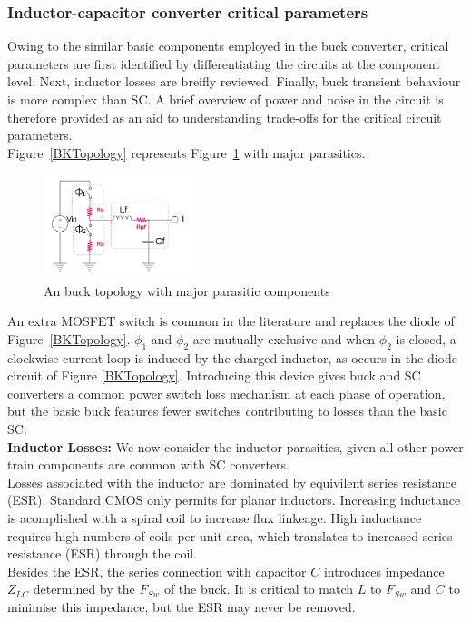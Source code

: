 \documentclass[letterpaper,twocolumn,10pt]{article}
\begin{document}

\subsubsection{Inductor-capacitor converter critical parameters}

Owing to the similar basic components employed in the buck converter, critical parameters are first identified by differentiating the circuits at the component level. Next, inductor losses are breifly reviewed. Finally, buck transient behaviour is more complex than SC. A brief overview of power and noise in the circuit is therefore provided as an aid to understanding trade-offs for the critical circuit parameters.\\
Figure~\ref{BKTopology} represents Figure~\ref{NonIdealBuckTopology} with major parasitics.\\
\begin{figure}[here]
\includegraphics[width=0.4\textwidth]{BuckTopologyParasitics}
\caption{An buck topology with major parasitic components}
\label{NonIdealBuckTopology}
\end{figure}
An extra MOSFET switch is common in the literature and replaces the diode of Figure~\ref{BKTopology}. $\phi_1$ and $\phi_2$ are mutually exclusive and when $\phi_2$ is closed, a clockwise current loop is induced by the charged inductor, as occurs in the diode circuit of Figure \ref{BKTopology}. Introducing this device gives buck and SC converters a common power switch loss mechanism at each phase of operation, but the basic buck features fewer switches contributing to losses than the basic SC.\\

\textbf{Inductor Losses: }We now consider the inductor parasitics, given all other power train components are common with SC converters.\\
Losses associated with the inductor are dominated by equivilent series resistance (ESR). Standard CMOS only permits for planar inductors. Increasing inductance is acomplished with a spiral coil to increase flux linkeage. High inductance requires high numbers of coils per unit area, which translates to increased series resistance (ESR) through the coil.\\
Besides the ESR, the series connection with capacitor $C$ introduces impedance $Z_{LC}$ determined by the $F_{Sw}$ of the buck. It is critical to match $L$ to $F_{Sw}$ and $C$ to minimise this impedance, but the ESR may never be removed.\\  
\end{document}
